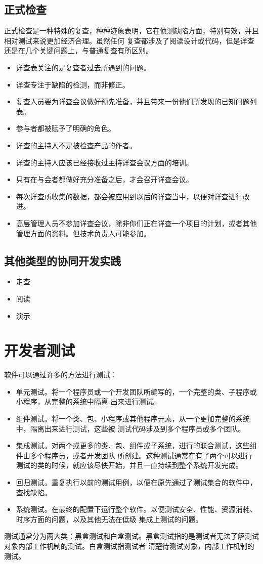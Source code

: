 \documentclass{article}
\begin{document}
\subsection{正式检查}
正式检查是一种特殊的复查，种种迹象表明，它在侦测缺陷方面，特别有效，并且相对测试来说更加经济合理。虽然任何
复查都涉及了阅读设计或代码，但是详查还是在几个关键问题上，与普通复查有所区别。
\begin{itemize}
    \item 详查表关注的是复查者过去所遇到的问题。
    \item 详查专注于缺陷的检测，而非修正。
    \item 复查人员要为详查会议做好预先准备，并且带来一份他们所发现的已知问题列表。
    \item 参与者都被赋予了明确的角色。
    \item 详查的主持人不是被检查产品的作者。
    \item 详查的主持人应该已经接收过主持详查会议方面的培训。
    \item 只有在与会者都做好充分准备之后，才会召开详查会议。
    \item 每次详查所收集的数据，都会被应用到以后的详查当中，以便对详查进行改进。
    \item 高层管理人员不参加详查会议，除非你们正在详查一个项目的计划，或者其他管理方面的资料。但技术负责人可能参加。
\end{itemize}

\subsection{其他类型的协同开发实践}
\begin{itemize}
    \item 走查
    \item 阅读
    \item 演示
\end{itemize}

\section{开发者测试}
软件可以通过许多的方法进行测试：
\begin{itemize}
    \item 单元测试。将一个程序员或一个开发团队所编写的，一个完整的类、子程序或小程序，从完整的系统中隔离
    出来进行测试。
    \item 组件测试。将一个类、包、小程序或其他程序元素，从一个更加完整的系统中，隔离出来进行测试，这些被
    测试代码涉及到多个程序员或多个团队。
    \item 集成测试。对两个或更多的类、包、组件或子系统，进行的联合测试，这些组件由多个程序员，或者开发团队
    所创建。这种测试通常在有了两个可以进行测试的类的时候，就应该尽快开始，并且一直持续到整个系统开发完成。
    \item 回归测试。重复执行以前的测试用例，以便在原先通过了测试集合的软件中，查找缺陷。
    \item 系统测试。在最终的配置下运行整个软件。以便测试安全、性能、资源消耗、时序方面的问题，以及其他无法在低级
    集成上测试的问题。
\end{itemize}
测试通常分为两大类：黑盒测试和白盒测试。黑盒测试指的是测试者无法了解测试对象内部工作机制的测试。白盒测试指测试者
清楚待测试对象，内部工作机制的测试。
\end{document}

